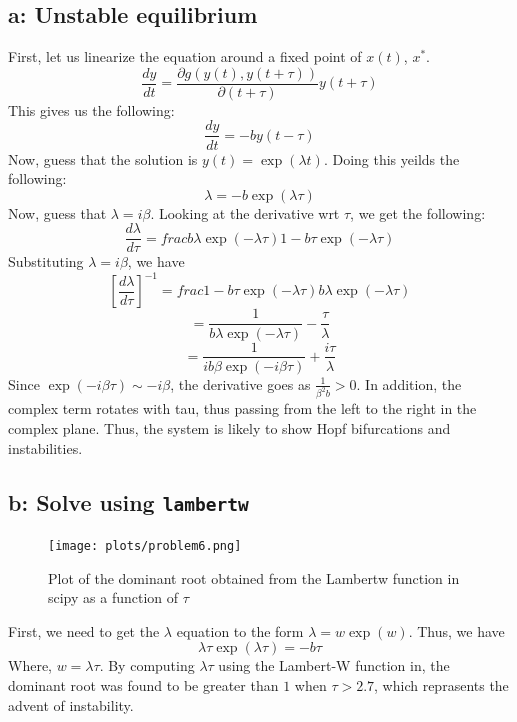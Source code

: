 \documentclass[english]{article}
\begin{document}
\subsection*{a: Unstable equilibrium}
First, let us linearize the equation around a fixed point of $x(t)$, $x^{*}$. 
$$ \frac{dy}{dt} = \frac{\partial g(y(t),y(t+\tau))}{\partial (t+\tau)}y(t+\tau)$$
This gives us the following:
$$ \frac{dy}{dt} = -by(t-\tau)$$
Now, guess that the solution is $y(t)=\exp(\lambda t)$. Doing this yeilds the following:
$$ \lambda = -b\exp(\lambda \tau)$$
Now, guess that $\lambda = i\beta$. Looking at the derivative wrt $\tau$, we get
the following:
$$ \frac{d\lambda}{d\tau} = frac{b\lambda\exp(-\lambda\tau)}{1-b\tau\exp(-\lambda\tau)}$$
Substituting $\lambda = i\beta$, we have
$$ \left[\frac{d\lambda}{d\tau}\right]^{-1} = frac{1-b\tau\exp(-\lambda\tau)}{b\lambda\exp(-\lambda\tau)}$$
$$ = \frac{1}{b\lambda\exp(-\lambda\tau)}-\frac{\tau}{\lambda}$$
$$ = \frac{1}{ib\beta\exp(-i\beta\tau)}+\frac{i\tau}{\lambda}$$
Since $\exp(-i\beta\tau) \sim -i\beta$, the derivative goes as $ \frac{1}{\beta^{2}b} > 0$.
In addition, the complex term rotates with tau, thus passing from the left to
the right in the complex plane. 
Thus, the system is likely to show Hopf bifurcations and instabilities.

\subsection*{b: Solve using \lstinline{lambertw}}
\begin{figure}[H]
	\centering
	\texttt{[image: plots/problem6.png]}
	\caption{Plot of the dominant root obtained from the Lambertw function in scipy as a function of $\tau$}
	\label{fig:problem6}
\end{figure}

First, we need to get the $\lambda$ equation to the form $\lambda = w\exp(w)$.
Thus, we have
$$ \lambda\tau\exp(\lambda \tau) = -b\tau$$
Where, $w = \lambda\tau$. By computing $\lambda\tau$ using the Lambert-W function in,
the dominant root was found to be greater than $1$ when $\tau > 2.7$, which reprasents
the advent of instability.
\end{document}
